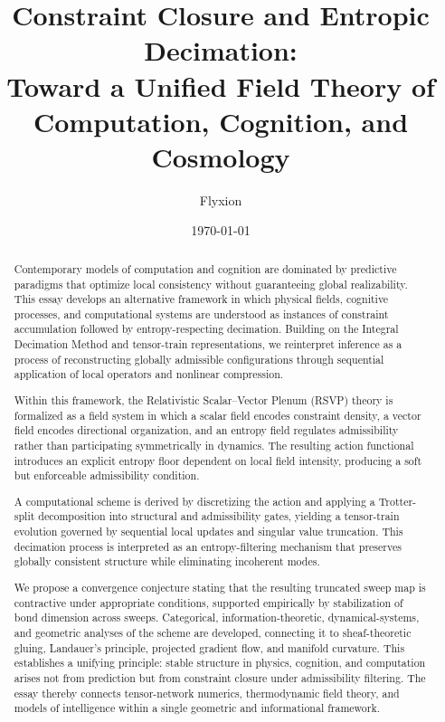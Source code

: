 \documentclass[11pt]{article}
\title{Constraint Closure and Entropic Decimation:\\
Toward a Unified Field Theory of Computation, Cognition, and Cosmology}
\author{Flyxion}
\date{\today}
\theoremstyle{definition}
\begin{document}
\maketitle

\begin{abstract}
Contemporary models of computation and cognition are dominated by predictive
paradigms that optimize local consistency without guaranteeing global
realizability. This essay develops an alternative framework in which physical
fields, cognitive processes, and computational systems are understood as
instances of constraint accumulation followed by entropy-respecting decimation.
Building on the Integral Decimation Method and tensor-train representations, we
reinterpret inference as a process of reconstructing globally admissible
configurations through sequential application of local operators and nonlinear
compression.

Within this framework, the Relativistic Scalar--Vector Plenum (RSVP) theory is
formalized as a field system in which a scalar field encodes constraint density,
a vector field encodes directional organization, and an entropy field regulates
admissibility rather than participating symmetrically in dynamics. The resulting
action functional introduces an explicit entropy floor dependent on local field
intensity, producing a soft but enforceable admissibility condition.

A computational scheme is derived by discretizing the action and applying a
Trotter-split decomposition into structural and admissibility gates, yielding a
tensor-train evolution governed by sequential local updates and singular value
truncation. This decimation process is interpreted as an entropy-filtering
mechanism that preserves globally consistent structure while eliminating
incoherent modes.

We propose a convergence conjecture stating that the resulting truncated sweep
map is contractive under appropriate conditions, supported empirically by
stabilization of bond dimension across sweeps. Categorical, information-theoretic,
dynamical-systems, and geometric analyses of the scheme are developed, connecting
it to sheaf-theoretic gluing, Landauer's principle, projected gradient flow, and
manifold curvature. This establishes a unifying principle: stable structure in
physics, cognition, and computation arises not from prediction but from constraint
closure under admissibility filtering. The essay thereby connects tensor-network
numerics, thermodynamic field theory, and models of intelligence within a single
geometric and informational framework.
\end{abstract}
\end{document}
